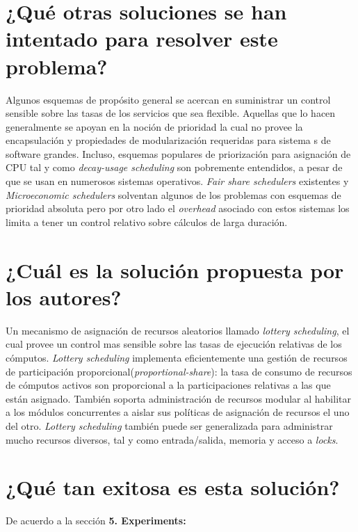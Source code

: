 \section{¿Qué otras soluciones se han intentado para resolver este problema?}
Algunos esquemas de propósito general se acercan en suministrar un control sensible sobre las tasas de los servicios que sea flexible. Aquellas que lo hacen generalmente se apoyan en la noción de prioridad la cual no provee la encapsulación y propiedades de modularización requeridas para sistema s de software grandes. Incluso, esquemas populares de priorización para asignación de CPU tal y como \textit{decay-usage scheduling} son pobremente entendidos, a pesar de que se usan en numerosos sistemas operativos. \textit{Fair share schedulers} existentes y \textit{Microeconomic schedulers} solventan algunos de los problemas con esquemas de prioridad absoluta pero por otro lado el \textit{overhead} asociado con estos sistemas los limita a tener un control relativo sobre cálculos de larga duración.
     
\section{¿Cuál es la solución propuesta por los autores?}
Un mecanismo de asignación de recursos aleatorios llamado \textit{lottery scheduling}, el cual provee un control mas sensible sobre las tasas de ejecución relativas de los cómputos. \textit{Lottery scheduling} implementa eficientemente una gestión de recursos de participación proporcional(\textit{proportional-share}): la tasa de consumo de recursos de cómputos activos son proporcional a la participaciones relativas a las que están asignado. También soporta administración de recursos modular al habilitar a los módulos concurrentes a aislar sus políticas de asignación de recursos el uno del otro. \textit{Lottery scheduling} también puede ser generalizada para administrar mucho recursos diversos, tal y como entrada/salida, memoria y acceso a \textit{locks}.

\section{¿Qué tan exitosa es esta solución?} 
De acuerdo a la sección \textbf{5. Experiments:}


